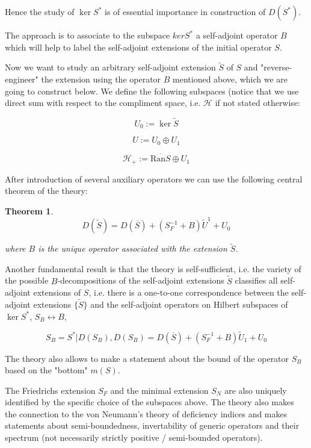 \documentclass[11pt, a4paper, german]{article}
\theoremstyle{plain}
\newtheorem{theorem}{Theorem}
\theoremstyle{definition}
\theoremstyle{remark}
\numberwithin{equation}{section}
\numberwithin{theorem}{section}
\begin{document}
Hence the study of $\ker S^*$ is of essential importance in construction of $D(S^*)$.

The approach is to associate to the subspace $ker S^*$ a self-adjoint operator $B$ which will help to label the self-adjoint extensions of the initial operator $S$.

Now we want to study an arbitrary self-adjoint extension $\tilde{S}$ of $S$ and "reverse-engineer" the extension using the operator $B$ mentioned above, which we are going to construct below. We define the following subspaces (notice that we use direct sum with respect to the compliment space, i.e. $\mathcal{H}$ if not stated otherwise:

$$U_0 := \ker \tilde{S}$$

$$U := U_0 \oplus U_1$$

$$\mathcal{H}_+ := \overline{\text{Ran} S} \oplus U_1$$

After introduction of several auxiliary operators we can use the following central theorem of the theory:

\begin{theorem}
\begin{equation}
D(\tilde{S}) = D(\overline{S}) + (S_F^{-1} + B) \tilde{U}^1 + U_0
\end{equation}

where $B$ is the unique operator associated with the extension $\tilde{S}$.

\end{theorem}

Another fundamental result is that the theory is self-sufficient, i.e. the variety of the possible $B$-decompositions of the self-adjoint extensions $\tilde{S}$ classifies all self-adjoint extensions of $S$, i.e. there is a one-to-one correspondence between the self-adjoint extensions $\{\tilde{S}\}$ and the self-adjoint operators on Hilbert subspaces of $\ker S^*$, $S_B \leftrightarrow B$,

\begin{equation}
S_B = S^* | D(S_B),
D(S_B) = D(\overline{S}) + (S_F^{-1} + B) \tilde{U}_1 + U_0
\end{equation}

The theory also allows to make a statement about the bound of the operator $S_B$ based on the "bottom" $m(S)$.

The Friedrichs extension $S_F$ and the minimal extension $S_N$ are also uniquely identified by the specific choice of the subspaces above. The theory also makes the connection to the von Neumann's theory of deficiency indices and makes statements about semi-boundedness, invertability of generic operators and their spectrum (not necessarily strictly positive / semi-bounded operators).
\end{document}
